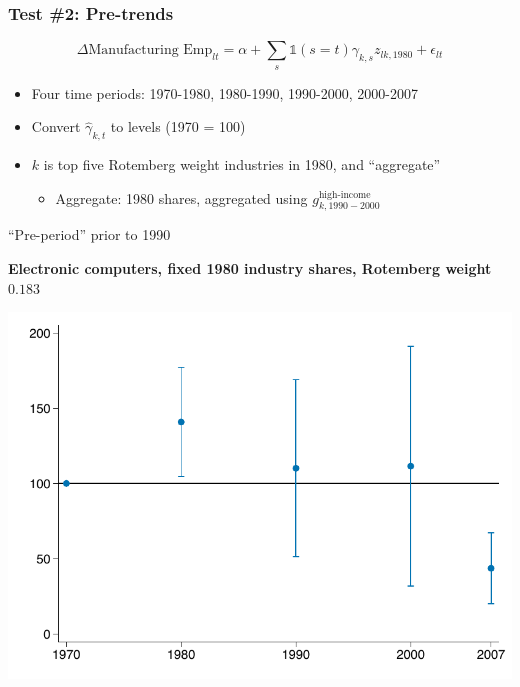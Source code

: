 \documentclass[notes,11pt, aspectratio=169]{beamer}
\begin{document}

\begin{frame}[label=overidtest]
\frametitle{Test \#2: Pre-trends}


\begin{equation*}
  \Delta \text{Manufacturing Emp}_{lt} = \alpha +  \sum_{s} \mathbb{1}(s=t) \gamma_{k,s} z_{lk, 1980}+ \epsilon_{lt}
\end{equation*}


  \begin{itemize}
\item Four time periods:   1970-1980, 1980-1990, 1990-2000, 2000-2007
  \item Convert $\hat{\gamma}_{k,t}$ to levels (1970 = 100)
\item $k$ is top five Rotemberg weight industries in 1980, and ``aggregate'' 
	\begin{itemize}
	\item Aggregate: 1980 shares, aggregated using $g_{k,1990-2000}^{\text{high-income}}$
	\end{itemize}

  \end{itemize}
``Pre-period'' prior to 1990

\end{frame}








\begin{frame}[label=ind3571_gr1980]
\addtocounter{framenumber}{-1}
\textbf{Electronic computers, fixed 1980 industry shares, Rotemberg weight $ 0.183 $}


\begin{center}
		\includegraphics[scale=0.73]{images/share_emp_ind_bhj_3571_pre_trends_index1980.pdf}
\end{center}




\end{frame}
\end{document}
